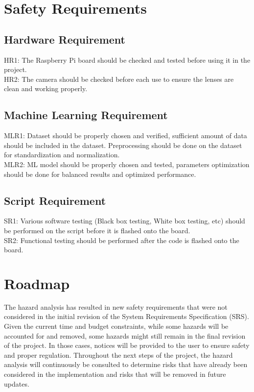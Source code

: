 \documentclass{article}
\begin{document}
\section{Safety Requirements}
\subsection{Hardware Requirement}
HR1: The Raspberry Pi board should be checked and tested before using it in the project.\\
HR2: The camera should be checked before each use to ensure the lenses are clean and working properly.
\subsection{Machine Learning Requirement}
MLR1: Dataset should be properly chosen and verified, sufficient amount of data should be included in the dataset. Preprocessing should be done on the dataset for standardization and normalization.\\
MLR2: ML model should be properly chosen and tested, parameters optimization should be done for balanced results and optimized performance.
\subsection{Script Requirement}
SR1: Various software testing (Black box testing, White box testing, etc) should be performed on the script before it is flashed onto the board.\\
SR2: Functional testing should be performed after the code is flashed onto the board.

\section{Roadmap}
The hazard analysis has resulted in new safety requirements that were not considered in the initial revision of the 
System Requirements Specification (SRS). Given the current time and budget constraints, while some hazards will be accounted 
for and removed, some hazards might still remain in the final revision of the project. In those cases, notices will be provided 
to the user to ensure safety and proper regulation. Throughout the next steps of the project, the hazard analysis will continuously 
be consulted to determine risks that have already been considered in the implementation and risks that will be removed in future updates.
\end{document}
